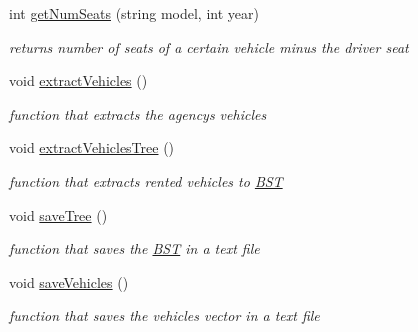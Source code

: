\begin{Indent}
\begin{DoxyCompactItemize}
int \hyperlink{class_agency_a55fd7b63ca65ffdb6dfe8694301af29c}{get\+Num\+Seats} (string model, int year)
\begin{DoxyCompactList}\small\item\em returns number of seats of a certain vehicle minus the driver seat \end{DoxyCompactList}\item 
\mbox{\label{class_agency_aa9a66ffb449986839a0089fc7239ac54}} 
void \hyperlink{class_agency_aa9a66ffb449986839a0089fc7239ac54}{extract\+Vehicles} ()
\begin{DoxyCompactList}\small\item\em function that extracts the agency\textquotesingle{}s vehicles \end{DoxyCompactList}\item 
\mbox{\label{class_agency_aa88930db176fb321347b28e279699d4f}} 
void \hyperlink{class_agency_aa88930db176fb321347b28e279699d4f}{extract\+Vehicles\+Tree} ()
\begin{DoxyCompactList}\small\item\em function that extracts rented vehicles to \hyperlink{class_b_s_t}{B\+ST} \end{DoxyCompactList}\item 
\mbox{\label{class_agency_a33c07400077f762e86f9e5cf1292ef17}} 
void \hyperlink{class_agency_a33c07400077f762e86f9e5cf1292ef17}{save\+Tree} ()
\begin{DoxyCompactList}\small\item\em function that saves the \hyperlink{class_b_s_t}{B\+ST} in a text file \end{DoxyCompactList}\item 
\mbox{\label{class_agency_a7d290600e2b02d64db22c5bfcb61c94b}} 
void \hyperlink{class_agency_a7d290600e2b02d64db22c5bfcb61c94b}{save\+Vehicles} ()
\begin{DoxyCompactList}\small\item\em function that saves the vehicles vector in a text file \end{DoxyCompactList}\end{DoxyCompactItemize}
\end{Indent}
